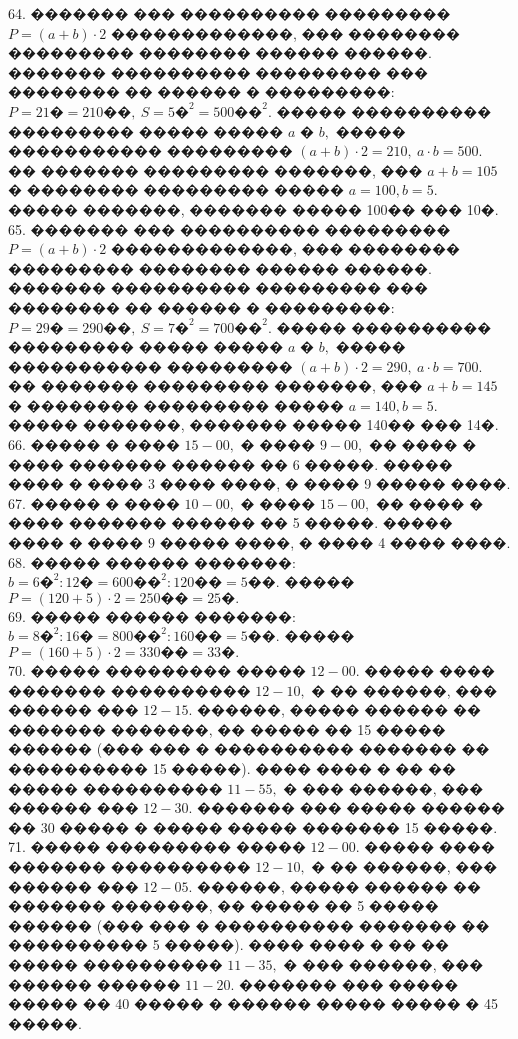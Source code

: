 \documentclass[12pt]{article}
\begin{document}
64. ������� ��� ���������� ��������� $P=(a+b)\cdot2$ �������������, ��� �������� ��������� �������� ������ ������. ������� ���������� ��������� ��� �������� �� ������ � ���������: $P=21\text{�}=210\text{��},\ S=5\text{�}^2=500\text{��}^2.$ ����� ���������� ��������� ����� ����� $a$ � $b,$ ����� ����������� ��������� $(a+b)\cdot2=210,\ a\cdot b=500.$ �� ������� ��������� �������, ��� $a+b=105$ � �������� ��������� ����� $a=100, b=5.$ ����� �������, ������� ����� 100�� ��� 10�.\\
65. ������� ��� ���������� ��������� $P=(a+b)\cdot2$ �������������, ��� �������� ��������� �������� ������ ������. ������� ���������� ��������� ��� �������� �� ������ � ���������: $P=29\text{�}=290\text{��},\ S=7\text{�}^2=700\text{��}^2.$ ����� ���������� ��������� ����� ����� $a$ � $b,$ ����� ����������� ��������� $(a+b)\cdot2=290,\ a\cdot b=700.$ �� ������� ��������� �������, ��� $a+b=145$ � �������� ��������� ����� $a=140, b=5.$ ����� �������, ������� ����� 140�� ��� 14�.\\
66. ����� � ���� $15-00,$ � ���� $9-00,$ �� ���� � ���� ������� ������ �� 6 �����. ����� ���� � ���� 3 ���� ����, � ���� 9 ����� ����.\\
67. ����� � ���� $10-00,$ � ���� $15-00,$ �� ���� � ���� ������� ������ �� 5 �����. ����� ���� � ���� 9 ����� ����, � ���� 4 ���� ����.\\
68. ����� ������ �������: $b=6\text{�}^2:12\text{�}=600\text{��}^2:120\text{��}=5\text{��}.$ ����� $P=(120+5)\cdot2=250\text{��}=25\text{�}.$\\
69. ����� ������ �������: $b=8\text{�}^2:16\text{�}=800\text{��}^2:160\text{��}=5\text{��}.$ ����� $P=(160+5)\cdot2=330\text{��}=33\text{�}.$\\
70. ����� ��������� ����� $12-00.$ ����� ���� ������� ���������� $12-10,$ � �� ������, ��� ������ ��� $12-15.$ ������, ����� ������ �� ������� �������, �� ����� �� 15 ����� ������ (��� ��� � ���������� ������� �� ���������� 15 �����). ���� ���� � �� �� ����� ���������� $11-55,$ � ��� ������, ��� ������ ��� $12-30.$ ������� ��� ����� ������ �� 30 ����� � ����� ����� ������� 15 �����.\\
71. ����� ��������� ����� $12-00.$ ����� ���� ������� ���������� $12-10,$ � �� ������, ��� ������ ��� $12-05.$ ������, ����� ������ �� ������� �������, �� ����� �� 5 ����� ������ (��� ��� � ���������� ������� �� ���������� 5 �����). ���� ���� � �� �� ����� ���������� $11-35,$ � ��� ������, ��� ������ ������ $11-20.$ ������� ��� ����� ����� �� 40 ����� � ������ ����� ����� � 45 �����.\\
\end{document}
